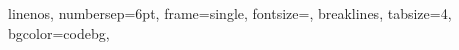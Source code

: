 \documentclass[a4paper]{article}
\begin{document}
\newpage
\renewcommand{\contentsname}{Mục lục}
\tableofcontents
\newpage
\renewcommand{\listfigurename}{Danh mục hình ảnh}
\listoffigures
\newpage



\onehalfspacing

\setminted
{
    linenos,                %
    numbersep=6pt,          %
    frame=single,           %
    fontsize=\normalsize,
    breaklines,             %
    tabsize=4,
    bgcolor=codebg,
}


% 









\end{document}
